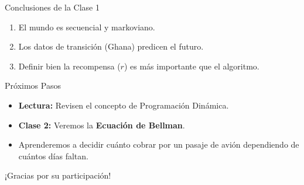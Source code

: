 \documentclass{beamer}
\begin{document}
\begin{frame}{Conclusiones de la Clase 1}
\begin{enumerate}
    \item El mundo es secuencial y markoviano.
    \item Los datos de transición (Ghana) predicen el futuro.
    \item Definir bien la recompensa ($r$) es más importante que el algoritmo.
\end{enumerate}
\end{frame}

\begin{frame}{Próximos Pasos}
\begin{itemize}
    \item \textbf{Lectura:} Revisen el concepto de Programación Dinámica.
    \item \textbf{Clase 2:} Veremos la \textbf{Ecuación de Bellman}.
    \item Aprenderemos a decidir cuánto cobrar por un pasaje de avión dependiendo de cuántos días faltan.
\end{itemize}
\vspace{0.8cm}
\centering
\Large ¡Gracias por su participación!
\end{frame}
\end{document}
